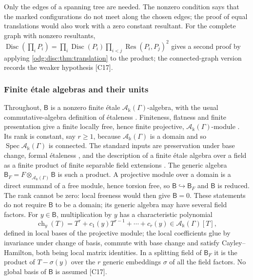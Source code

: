 \documentclass[11pt,oneside]{article}
\numberwithin{equation}{section}
\theoremstyle{definition}
\theoremstyle{remark}
\newcommand{\src}[1]{\textup{\textsf{\small[#1]}}}
\newcommand{\crA}{\mathcal A_\Bbbk(\Gamma)}
\newcommand{\Spec}{\operatorname{Spec}}
\newcommand{\Disc}{\operatorname{Disc}}
\newcommand{\Res}{\operatorname{Res}}
\begin{document}
Only the edges of a spanning tree are needed. The nonzero condition says that the marked
configurations do not meet along the chosen edges; the proof of equal translations would
also work with a zero constant resultant. For the complete graph with nonzero resultants,
$\Disc(\prod_iP_i)=\prod_i\Disc(P_i)\prod_{i<j}\Res(P_i,P_j)^2$ gives a second proof by
applying \cref{odg:disc:thm:translation} to the product; the connected-graph version
records the weaker hypothesis \src{C17}.

\subsubsection{Finite \texorpdfstring{\'etale}{etale} algebras and their units}\label{odg:disc:sub:etale}

Throughout, $\mathsf B$ is a nonzero finite \'etale $\crA$-algebra, with the usual
commutative-algebra definition of \'etaleness \cite{StacksEtale}. Finiteness,
flatness and finite presentation give a finite locally free, hence finite projective,
$\crA$-module \cite{StacksFiniteProjective}. Its rank is constant, say $r\ge1$, because
$\crA$ is a domain and so
$\Spec\crA$ is connected. The standard inputs are preservation under base change,
formal \'etaleness \cite{StacksFormal}, and the description of a finite \'etale algebra over
a field as a finite product of finite separable field extensions
\cite{StacksEtaleField}. The generic algebra $\mathsf B_F=F\otimes_{\crA}\mathsf B$ is such
a product. A projective module over a domain is a direct summand of a free module, hence
torsion free, so $\mathsf B\hookrightarrow\mathsf B_F$ and $\mathsf B$ is reduced.
The rank cannot be zero: local freeness would then give $\mathsf B=0$.
These statements do not require $\mathsf B$ to be a domain; its generic algebra may
have several field factors. For
$y\in\mathsf B$, multiplication by $y$ has a characteristic polynomial
\begin{equation}\label{odg:disc:eq:charB}
 \operatorname{ch}_y(T)=T^r+c_1(y)T^{r-1}+\cdots+c_r(y)\in\crA[T],
\end{equation}
defined in local bases of the projective module; the local coefficients glue by invariance
under change of basis, commute with base change and satisfy Cayley--Hamilton, both being
local matrix identities. In a splitting field of $\mathsf B_F$ it is the product of
$T-\sigma(y)$ over the $r$ generic embeddings $\sigma$ of all the field factors. No global
basis of $\mathsf B$ is assumed \src{C17}.
\end{document}
